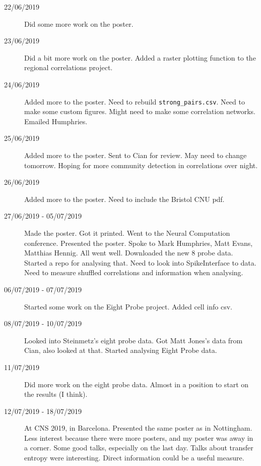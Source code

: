 \documentclass[a4paper,12pt]{article}
\theoremstyle{definition}
\begin{document}
\begin{description}
                                \item[22/06/2019] Did some more work on the poster.

                                \item[23/06/2019] Did a bit more work on the poster. Added a raster plotting function to the regional correlations project.

                                \item[24/06/2019] Added more to the poster. Need to rebuild \texttt{strong\_pairs.csv}. Need to make some custom figures. Might need to make some correlation networks. Emailed Humphries.

                                \item[25/06/2019] Added more to the poster. Sent to Cian for review. May need to change tomorrow. Hoping for more community detection  in correlations over night.

                                \item[26/06/2019] Added more to the poster. Need to include the Bristol CNU pdf. 

                                \item[27/06/2019 - 05/07/2019] Made the poster. Got it printed. Went to the Neural Computation conference. Presented the poster. Spoke to Mark Humphries, Matt Evans, Matthias Hennig. All went well. Downloaded the new 8 probe data. Started a repo for analysing that. Need to look into SpikeInterface to data. Need to measure shuffled correlations and information when analysing.

                                \item[06/07/2019 - 07/07/2019] Started some work on the Eight Probe project. Added cell info csv.
             
                                \item[08/07/2019 - 10/07/2019] Looked into Steinmetz's eight probe data. Got Matt Jones's data from Cian, also looked at that. Started analysing Eight Probe data.

                                \item[11/07/2019] Did more work on the eight probe data. Almost in a position to start on the results (I think).

                                \item[12/07/2019 - 18/07/2019] At CNS 2019, in Barcelona. Presented the same poster as in Nottingham. Less interest because there were more posters, and my poster was away in a corner. Some good talks, especially on the last day. Talks about transfer entropy were interesting. Direct information could be a useful measure.


\end{description}
\end{document}
